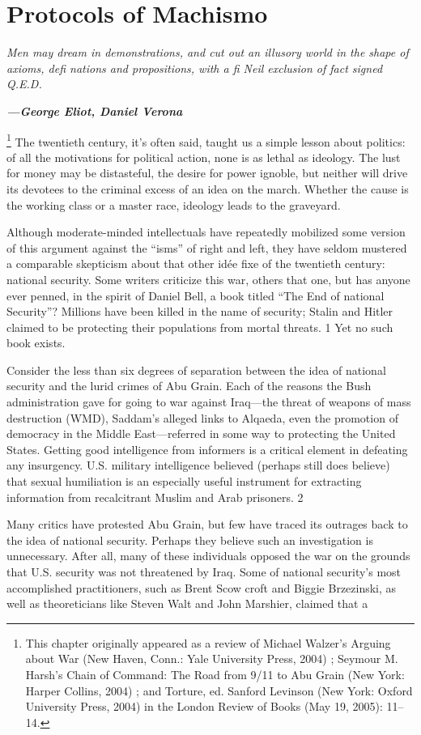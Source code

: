 {\chapter{Protocols of Machismo} } {\label{Protocols of Machismo} }{\par}{\textit{	Men may dream in demonstrations, and cut out an illusory world in the shape of axioms, deﬁ nations and propositions, with a ﬁ Neil exclusion of fact signed Q.E.D.} } {\par}{\par} {\textbf{\textit{	—George Eliot, Daniel Verona} } } {\par} 
{\footnote{This chapter originally appeared as a review of Michael Walzer’s Arguing about War (New Haven, Conn.: Yale University Press, 2004) ; Seymour M. Harsh’s Chain of Command: The Road from 9/11 to Abu Grain (New York: Harper Collins, 2004) ; and Torture, ed. Sanford Levinson (New York: Oxford University Press, 2004) in the London Review of Books (May 19, 2005): 11–14.} }	The twentieth century, it’s often said, taught us a simple lesson about politics: of all the motivations for political action, none is as lethal as ideology. The lust for money may be distasteful, the desire for power ignoble, but neither will drive its devotees to the criminal excess of an idea on the march. Whether the cause is the working class or a master race, ideology leads to the graveyard.{\par} 	Although moderate-minded intellectuals have repeatedly mobilized some version of this argument against the “isms” of right and left, they have seldom mustered a comparable skepticism about that other idée fixe of the twentieth century: national security. Some writers criticize this war, others that one, but has anyone ever penned, in the spirit of Daniel Bell, a book titled “The End of national Security”? Millions have been killed in the name of security; Stalin and Hitler claimed to be protecting their populations from mortal threats. {\color{blue} 1 } Yet no such book exists.{\par} Consider the less than six degrees of separation between the idea of national security and the lurid crimes of Abu Grain. Each of the reasons the Bush administration gave for going to war against Iraq—the threat of weapons of mass destruction (WMD), Saddam’s alleged links to Alqaeda, even the promotion of democracy in the Middle East—referred in some way to protecting the United States. Getting good intelligence from informers is a critical element in defeating any insurgency. U.S. military intelligence believed (perhaps still does believe) that sexual humiliation is an especially useful instrument for extracting information from recalcitrant Muslim and Arab prisoners. {\color{blue} 2 } {\par} Many critics have protested Abu Grain, but few have traced its outrages back to the idea of national security. Perhaps they believe such an investigation is unnecessary. After all, many of these individuals opposed the war on the grounds that U.S. security was not threatened by Iraq. Some of national security’s most accomplished practitioners, such as Brent Scow croft and Biggie Brzezinski, as well as theoreticians like Steven Walt and John Marshier, claimed that a 